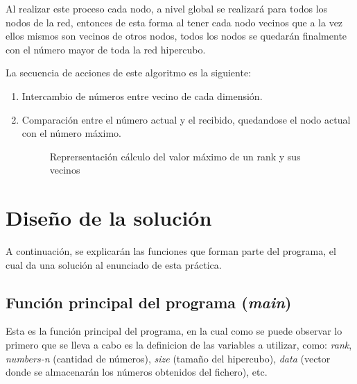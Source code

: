 \documentclass[11pt]{article}
\begin{document}
Al realizar este proceso cada nodo, a nivel global se realizará para todos los nodos de la red, entonces de esta forma al tener cada nodo vecinos que a la vez ellos mismos son vecinos de otros nodos, todos los nodos se quedarán finalmente con el número mayor de toda la red hipercubo.

La secuencia de acciones de este algoritmo es la siguiente:
\begin{enumerate}
	\item Intercambio de números entre vecino de cada dimensión.
	\item Comparación entre el número actual y el recibido, quedandose el nodo actual con el número máximo.

\begin{figure}[H]
  \centering
  \caption{Reprersentación cálculo del valor máximo de un rank y sus vecinos}
  \label{fig:toroide}
\end{figure}
\end{enumerate}

\clearpage

\section{Diseño de la solución}
A continuación, se explicarán las funciones que forman parte del programa, el cual da una solución al enunciado de esta práctica.
\\

\subsection{Función principal del programa (\textit{main})}
Esta es la función principal del programa, en la cual como se puede observar lo primero que se lleva a cabo es la definicion de las variables a utilizar, como: \textit{rank}, \textit{numbers-n} (cantidad de números), \textit{size} (tamaño del hipercubo), \textit{data} (vector donde se almacenarán los números obtenidos del fichero), etc.
\end{document}
